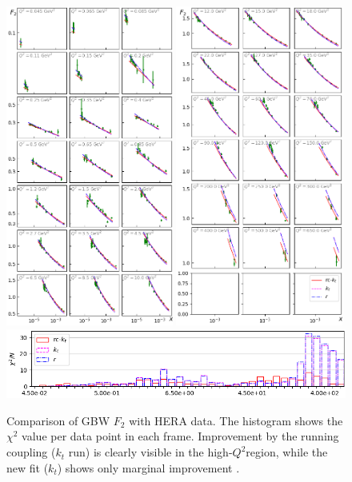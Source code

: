 \documentclass[12pt]{article}
\numberwithin{equation}{section}
\numberwithin{table}{section}
\numberwithin{figure}{section}
\begin{document}
\begin{figure}[p]
\includegraphics[width=0.49\textwidth]{./plots/Figure_1.png}
\includegraphics[width=0.49\textwidth]{./plots/Figure_2.png}
\includegraphics[width=\textwidth]{./plots/Figure_3.png}
\vspace{2mm}
\caption{Comparison of GBW $F_2$ with HERA data. The histogram shows the $\chi^2$ value per data point in each frame.
 Improvement by the running coupling ($k_t$ run) is clearly visible in the high-$Q^2$region, while the new fit ($k_t$) shows only marginal improvement .  }
\label{fig:GBW-Grid}
\end{figure}
\end{document}
